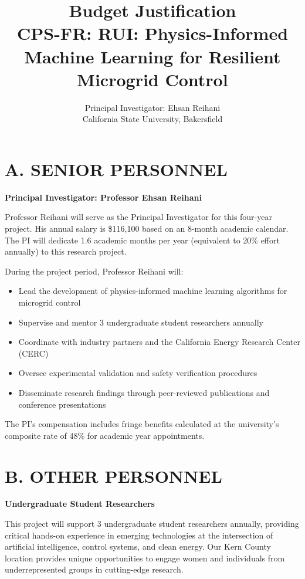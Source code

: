 \documentclass[12pt]{article}
\begin{document}
\title{\Large\textbf{Budget Justification\\CPS-FR: RUI: Physics-Informed Machine Learning for Resilient Microgrid Control}}
\author{Principal Investigator: Ehsan Reihani\\California State University, Bakersfield}
\date{}

\maketitle

\section{A. SENIOR PERSONNEL}

\textbf{Principal Investigator: Professor Ehsan Reihani}

Professor Reihani will serve as the Principal Investigator for this four-year project. His annual salary is \$116,100 based on an 8-month academic calendar. The PI will dedicate 1.6 academic months per year (equivalent to 20\% effort annually) to this research project.

During the project period, Professor Reihani will:
\begin{itemize}
    \item Lead the development of physics-informed machine learning algorithms for microgrid control
    \item Supervise and mentor 3 undergraduate student researchers annually
    \item Coordinate with industry partners and the California Energy Research Center (CERC)
    \item Oversee experimental validation and safety verification procedures
    \item Disseminate research findings through peer-reviewed publications and conference presentations
\end{itemize}

The PI's compensation includes fringe benefits calculated at the university's composite rate of 48\% for academic year appointments.

\section{B. OTHER PERSONNEL}

\textbf{Undergraduate Student Researchers}

This project will support 3 undergraduate student researchers annually, providing critical hands-on experience in emerging technologies at the intersection of artificial intelligence, control systems, and clean energy. Our Kern County location provides unique opportunities to engage women and individuals from underrepresented groups in cutting-edge research.
\end{document}
